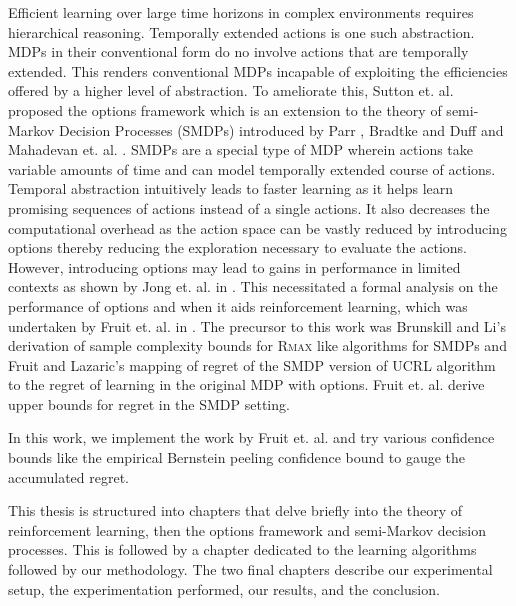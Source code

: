 Efficient learning over large time horizons in complex environments requires hierarchical reasoning.
Temporally extended actions is one such abstraction.
MDPs in their conventional form do no involve actions that are temporally extended.
This renders conventional MDPs incapable of exploiting the efficiencies offered by a higher level of abstraction.
To ameliorate this, Sutton et. al. proposed the options framework \cite{sutton_between_1999} which is an extension to the theory of semi-Markov Decision Processes (SMDPs) introduced by Parr \cite{parr_reinforcement_nodate}, Bradtke and Duff \cite{bradtke_reinforcement_1995} and Mahadevan et. al. \cite{mahadevan_self-improving_1997}.
SMDPs are a special type of MDP wherein actions take variable amounts of time and can model temporally extended course of actions.
Temporal abstraction intuitively leads to faster learning as it helps learn promising sequences of actions instead of a single actions.
It also decreases the computational overhead as the action space can be vastly reduced by introducing options thereby reducing the exploration necessary to evaluate the actions.
However, introducing options may lead to gains in performance in limited contexts as shown by Jong et. al. in \cite{jong_utility_2008}.
This necessitated a formal analysis on the performance of options and when it aids reinforcement learning, which was undertaken by Fruit et. al. in \cite{fruit_exploration--exploitation_2017}. 
The precursor to this work was Brunskill and Li's \cite{brunskill_pac-inspired_2014} derivation of sample complexity bounds for R\textsc{max} like algorithms for SMDPs and Fruit and Lazaric's \cite{fruit_exploration--exploitation_2017} mapping of regret of the SMDP version of UCRL algorithm to the regret of learning in the original MDP with options.
Fruit et. al. \cite{fruit_exploration--exploitation_2017} derive upper bounds for regret in the SMDP setting.

In this work, we implement the work by Fruit et. al.\cite{fruit_exploration--exploitation_2017} and try various confidence bounds like the empirical Bernstein peeling confidence bound to gauge the accumulated regret.

This thesis is structured into chapters that delve briefly into the theory of reinforcement learning, then the options framework and semi-Markov decision processes.
This is followed by a chapter dedicated to the learning algorithms followed by our methodology.
The two final chapters describe our experimental setup, the experimentation performed, our results, and the conclusion.


\newpage
